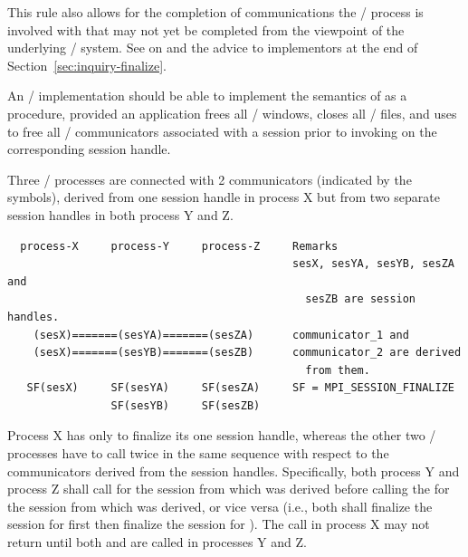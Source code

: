 \begin{implementors}
This rule also allows for the completion of communications the \MPI/ process is involved with
that may not yet be completed from the viewpoint of the underlying \MPI/ system.
See  on 
and the advice to implementors at the end of Section~\ref{sec:inquiry-finalize}.
\end{implementors}

\begin{implementors}
An \MPI/ implementation should be able to implement the semantics of 
as a  procedure,
provided an application frees all \MPI/ windows, closes all \MPI/ files,
and uses  to free all \MPI/ communicators
associated with a session
prior to invoking  on the corresponding session handle.
\end{implementors}

\begin{example}
\label{exa:session_finalize}
Three \MPI/ processes are connected with 2 communicators (indicated by the \code{=} symbols),
derived from one session handle in process X but from two separate session handles
in both process Y and Z.
\begin{verbatim}
  process-X     process-Y     process-Z     Remarks
                                            sesX, sesYA, sesYB, sesZA and
                                              sesZB are session handles.
    (sesX)=======(sesYA)=======(sesZA)      communicator_1 and
    (sesX)=======(sesYB)=======(sesZB)      communicator_2 are derived
                                              from them.
   SF(sesX)     SF(sesYA)     SF(sesZA)     SF = MPI_SESSION_FINALIZE
                SF(sesYB)     SF(sesZB)
\end{verbatim}

Process X has only to finalize its one session handle,
whereas the other two \MPI/ processes have to call
 twice in the same sequence with respect to
the communicators derived from the session handles.
Specifically, both process Y and process Z shall call 
for the session from which  was derived before calling the
 for the session from which  was derived,
or vice versa (i.e., both shall finalize the session for 
first then finalize the session for ).
The call  in process X may not return until
both  and  are called in processes Y and Z.
\end{example}

